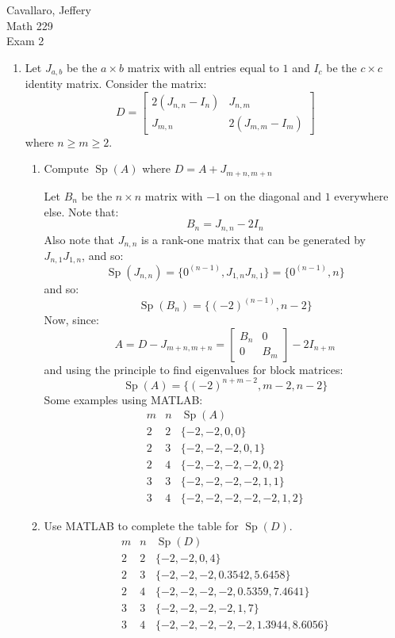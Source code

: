 \documentclass[letterpaper,12pt,fleqn]{article}
\DeclareMathOperator{\Sp}{Sp}
\begin{document}
Cavallaro, Jeffery \\
Math 229 \\
Exam 2

\bigskip


\begin{enumerate}
\item Let $J_{a,b}$ be the $a\times b$ matrix with all entries equal to $1$
  and $I_c$ be the $c\times c$ identity matrix. Consider the matrix:
  \[D=\begin{bmatrix}
  2(J_{n,n}-I_n) & J_{n,m} \\
  J_{m,n} & 2(J_{m,m}-I_m)
  \end{bmatrix}\]
  where $n\ge m\ge2$.
  \begin{enumerate}
  \item Compute $\Sp(A)$ where $D=A+J_{m+n,m+n}$

    Let $B_n$ be the $n\times n$ matrix with $-1$ on the diagonal and $1$
    everywhere else. Note that:
    \[B_n=J_{n,n}-2I_n\]
    Also note that $J_{n,n}$ is a rank-one matrix that can be generated
    by $J_{n,1}J_{1,n}$, and so:
    \[\Sp(J_{n,n})=\{0^{(n-1)},J_{1,n}J_{n,1}\}=\{0^{(n-1)},n\}\]
    and so:
    \[\Sp(B_n)=\{(-2)^{(n-1)},n-2\}\]
    Now, since:
    \[A=D-J_{m+n,m+n}=\begin{bmatrix} B_n & 0 \\ 0 & B_m \end{bmatrix}-
    2I_{n+m}\]
    and using the principle to find eigenvalues for block matrices:
    \[\Sp(A)=\{(-2)^{n+m-2},m-2,n-2\}\]
    Some examples using MATLAB:
    \[\begin{array}{cc|l}
    m & n & \Sp(A) \\
    \hline
    2 & 2 & \{-2,-2,0,0\} \\
    2 & 3 & \{-2,-2,-2,0,1\} \\
    2 & 4 & \{-2,-2,-2,-2,0,2\} \\
    3 & 3 & \{-2,-2,-2,-2,1,1\} \\
    3 & 4 & \{-2,-2,-2,-2,-2,1,2\}
    \end{array}\]

  \item Use MATLAB to complete the table for $\Sp(D)$.
    \[\begin{array}{cc|l}
    m & n & \Sp(D) \\
    \hline
    2 & 2 & \{-2,-2,0,4\} \\
    2 & 3 & \{-2,-2,-2,0.3542,5.6458\} \\
    2 & 4 & \{-2,-2,-2,-2,0.5359,7.4641\} \\
    3 & 3 & \{-2,-2,-2,-2,1,7\} \\
    3 & 4 & \{-2,-2,-2,-2,-2,1.3944,8.6056\}
    \end{array}\]


\end{enumerate}
\end{enumerate}
\end{document}
